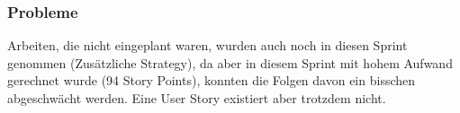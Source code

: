 \subsubsection*{Probleme}
Arbeiten, die nicht eingeplant waren, wurden auch noch in diesen Sprint genommen (Zusätzliche Strategy), da aber in diesem Sprint mit hohem Aufwand gerechnet wurde (94 Story Points), konnten die Folgen davon ein bisschen abgeschwächt werden.
Eine User Story existiert aber trotzdem nicht.

